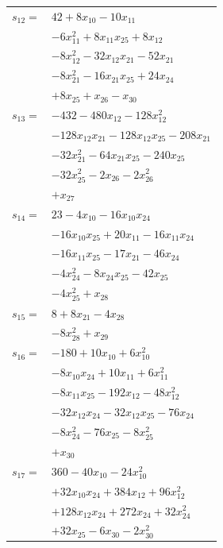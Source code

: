 \begin{longtable}{@{}r@{\;}l@{}}
\(s_{12}=\) & \(\displaystyle 42 +8x_{10} -10x_{11}\) \\
 & \(\displaystyle -6x_{11}^{2} +8x_{11}x_{25} +8x_{12}\) \\
 & \(\displaystyle -8x_{12}^{2} -32x_{12}x_{21} -52x_{21}\) \\
 & \(\displaystyle -8x_{21}^{2} -16x_{21}x_{25} +24x_{24}\) \\
 & \(\displaystyle +8x_{25} +x_{26} -x_{30}\) \\[3pt]
\(s_{13}=\) & \(\displaystyle -432 -480x_{12} -128x_{12}^{2}\) \\
 & \(\displaystyle -128x_{12}x_{21} -128x_{12}x_{25} -208x_{21}\) \\
 & \(\displaystyle -32x_{21}^{2} -64x_{21}x_{25} -240x_{25}\) \\
 & \(\displaystyle -32x_{25}^{2} -2x_{26} -2x_{26}^{2}\) \\
 & \(\displaystyle +x_{27}\) \\[3pt]
\(s_{14}=\) & \(\displaystyle 23 -4x_{10} -16x_{10}x_{24}\) \\
 & \(\displaystyle -16x_{10}x_{25} +20x_{11} -16x_{11}x_{24}\) \\
 & \(\displaystyle -16x_{11}x_{25} -17x_{21} -46x_{24}\) \\
 & \(\displaystyle -4x_{24}^{2} -8x_{24}x_{25} -42x_{25}\) \\
 & \(\displaystyle -4x_{25}^{2} +x_{28}\) \\[3pt]
\(s_{15}=\) & \(\displaystyle 8 +8x_{21} -4x_{28}\) \\
 & \(\displaystyle -8x_{28}^{2} +x_{29}\) \\[3pt]
\(s_{16}=\) & \(\displaystyle -180 +10x_{10} +6x_{10}^{2}\) \\
 & \(\displaystyle -8x_{10}x_{24} +10x_{11} +6x_{11}^{2}\) \\
 & \(\displaystyle -8x_{11}x_{25} -192x_{12} -48x_{12}^{2}\) \\
 & \(\displaystyle -32x_{12}x_{24} -32x_{12}x_{25} -76x_{24}\) \\
 & \(\displaystyle -8x_{24}^{2} -76x_{25} -8x_{25}^{2}\) \\
 & \(\displaystyle +x_{30}\) \\[3pt]
\(s_{17}=\) & \(\displaystyle 360 -40x_{10} -24x_{10}^{2}\) \\
 & \(\displaystyle +32x_{10}x_{24} +384x_{12} +96x_{12}^{2}\) \\
 & \(\displaystyle +128x_{12}x_{24} +272x_{24} +32x_{24}^{2}\) \\
 & \(\displaystyle +32x_{25} -6x_{30} -2x_{30}^{2}\) \\

\end{longtable}
